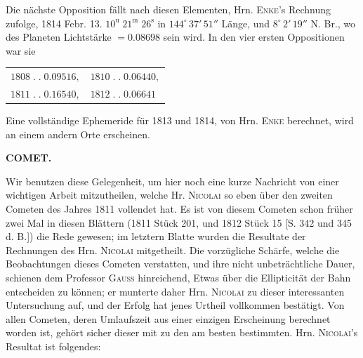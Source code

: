 \par\indent Die nächste Opposition fällt nach diesen Elementen, Hrn. \textsc{Enke}'s Rechnung zufolge, 1814 Febr. 13.
$10^{\mathrm u}\;21^{\mathrm m}\;26^{\mathrm s}$ in $144^\circ\,37'\,51''$ Länge, und $8^\circ\,2'\,19''$
N. Br., wo des Planeten Lichtstärke $= 0.08698$ sein wird. In den vier ersten Oppositionen war sie

\medskip
\begin{center}\begin{tabular}{ll}$1808\;.\;.\;0.09516,$ & $1810\;.\;.\;0.06440,$\\$1811\;.\;.\;0.16540,$ & $1812\;.\;.\;0.06641$\end{tabular}\end{center}

\medskip
\noindent Eine vollständige Ephemeride für 1813 und 1814, von Hrn. \textsc{Enke} berechnet, wird an einem
andern Orte erscheinen.

\clearpage
\endgroup
\clearpage
\begingroup
\pagestyle{empty}
\thispagestyle{empty}
\noindent{}%
%
\parbox[t]{\dimexpr\linewidth-24mm\relax}{\centering\footnotesize\bfseries COMET.\par}%
\makebox[12mm][r]{}\par\nobreak\medskip
\par\indent Wir benutzen diese Gelegenheit, um hier noch eine kurze Nachricht von einer wichtigen Arbeit
mitzutheilen, welche Hr. \textsc{Nicolai} so eben über den zweiten Cometen des Jahres 1811 vollendet hat.
Es ist von diesem Cometen schon früher zwei Mal in diesen Blättern (1811 Stück 201, und 1812
Stück 15 [S. 342 und 345 d. B.]) die Rede gewesen; im letztern Blatte wurden die Resultate der
Rechnungen des Hrn. \textsc{Nicolai} mitgetheilt. Die vorzügliche Schärfe, welche die Beobachtungen dieses
Cometen verstatten, und ihre nicht unbeträchtliche Dauer, schienen dem Professor \textsc{Gauss} hinreichend,
Etwas über die Ellipticität der Bahn entscheiden zu können; er munterte daher Hrn. \textsc{Nicolai} zu
dieser interessanten Untersuchung auf, und der Erfolg hat jenes Urtheil vollkommen bestätigt. Von
allen Cometen, deren Umlaufszeit aus einer einzigen Erscheinung berechnet worden ist, gehört sicher
dieser mit zu den am besten bestimmten. Hrn. \textsc{Nicolai}'s Resultat ist folgendes:

